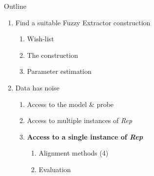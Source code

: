 \documentclass{beamer}
\def\fe{Fuzzy Extractor\xspace}
\newcommand{\rep}{\textit{Rep}\xspace}
\begin{document}
\begin{frame}{Outline}
   \begin{enumerate}
   \item Find a suitable \fe construction
\begin{enumerate}
    \item Wish-list
    \item The construction
    \item Parameter estimation\\
\end{enumerate}
   \item Data has noise
   \begin{enumerate}
       \item Access to the model \& probe
       \item Access to multiple instances of \rep
       \item \textbf{Access to a single instance of \rep}
        \begin{enumerate}
            \item Alignment methods (4)
            \item Evaluation
        \end{enumerate}
   \end{enumerate}    
\end{enumerate} 
\end{frame}
\end{document}
